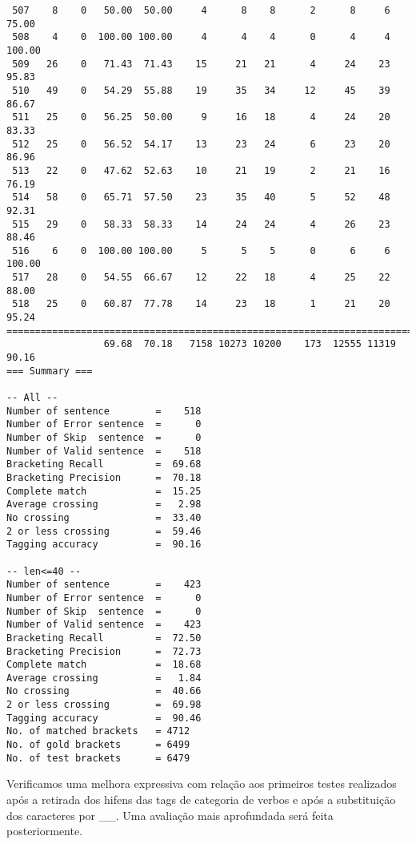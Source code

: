 \begin{verbatim}
 507    8    0   50.00  50.00     4      8    8      2      8     6    75.00
 508    4    0  100.00 100.00     4      4    4      0      4     4   100.00
 509   26    0   71.43  71.43    15     21   21      4     24    23    95.83
 510   49    0   54.29  55.88    19     35   34     12     45    39    86.67
 511   25    0   56.25  50.00     9     16   18      4     24    20    83.33
 512   25    0   56.52  54.17    13     23   24      6     23    20    86.96
 513   22    0   47.62  52.63    10     21   19      2     21    16    76.19
 514   58    0   65.71  57.50    23     35   40      5     52    48    92.31
 515   29    0   58.33  58.33    14     24   24      4     26    23    88.46
 516    6    0  100.00 100.00     5      5    5      0      6     6   100.00
 517   28    0   54.55  66.67    12     22   18      4     25    22    88.00
 518   25    0   60.87  77.78    14     23   18      1     21    20    95.24
============================================================================
                 69.68  70.18   7158 10273 10200    173  12555 11319    90.16
=== Summary ===

-- All --
Number of sentence        =    518
Number of Error sentence  =      0
Number of Skip  sentence  =      0
Number of Valid sentence  =    518
Bracketing Recall         =  69.68
Bracketing Precision      =  70.18
Complete match            =  15.25
Average crossing          =   2.98
No crossing               =  33.40
2 or less crossing        =  59.46
Tagging accuracy          =  90.16

-- len<=40 --
Number of sentence        =    423
Number of Error sentence  =      0
Number of Skip  sentence  =      0
Number of Valid sentence  =    423
Bracketing Recall         =  72.50
Bracketing Precision      =  72.73
Complete match            =  18.68
Average crossing          =   1.84
No crossing               =  40.66
2 or less crossing        =  69.98
Tagging accuracy          =  90.46
No. of matched brackets   = 4712
No. of gold brackets      = 6499
No. of test brackets      = 6479
\end{verbatim}

\normalsize

Verificamos uma melhora expressiva com relação aos primeiros testes realizados após a retirada dos hifens das tags de categoria de verbos e após a substituição dos caracteres \-\- por \_\_.
Uma avaliação mais aprofundada será feita posteriormente. 